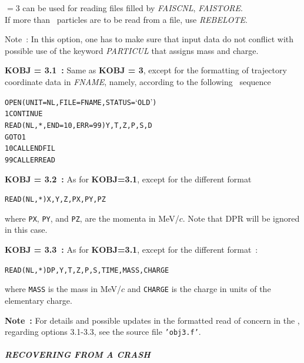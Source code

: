 \bigskip

\noindent \KOBJ $= 3 $    can be used for reading files filled by \textsl{FAISCNL}, \textsl{FAISTORE}.\\
If more than \IMAX\ particles are to be read from a file, use  \textsl{REBELOTE}.   

\bigskip

\noindent Note~: In this option, one has to make sure that input data do not conflict with possible use of 
the keyword \textsl{PARTICUL} that  assigns   mass and charge.

\bigskip

\noindent\textbf{KOBJ = 3.1~:} Same as \textbf{KOBJ = 3}, except for the formatting of trajectory coordinate 
data in  \textsl{FNAME}, namely, according to the following \FORTRAN\ sequence 
\begin{alltt}
\footnotesize
         OPEN (UNIT = NL, FILE = FNAME, STATUS = `OLD')
    1    CONTINUE
         READ (NL,*,END=10,ERR=99) Y, T, Z, P, S, D
         GOTO 1
   10    CALL ENDFIL
   99    CALL ERREAD
\end{alltt} 

\bigskip

\noindent\textbf{KOBJ = 3.2~:} As for \textbf{KOBJ=3.1}, except for the different format
\begin{alltt}
         READ(NL,*) X,Y,Z,PX,PY,PZ
\end{alltt}
where \texttt{PX}, \texttt{PY}, and \texttt{PZ}, are the momenta in
MeV/$c$.  Note that DPR will be ignored in this case.

\bigskip

\noindent\textbf{KOBJ = 3.3~:} As for \textbf{KOBJ=3.1}, except for the different format~: 
\begin{alltt}
         READ(NL,*) DP,Y,T,Z,P,S,TIME,MASS,CHARGE
\end{alltt}
where \texttt{MASS} is the mass in MeV/$c$ and \texttt{CHARGE} is the
charge in units of the elementary charge.  



\bigskip

\noindent \textbf{Note~:}  For details and possible updates in the formatted read of concern in the \FORTRAN, 
regarding options 3.1-3.3, see the source file \texttt{'obj3.f'}.


\paragraph{\textsl{RECOVERING FROM A CRASH}}

